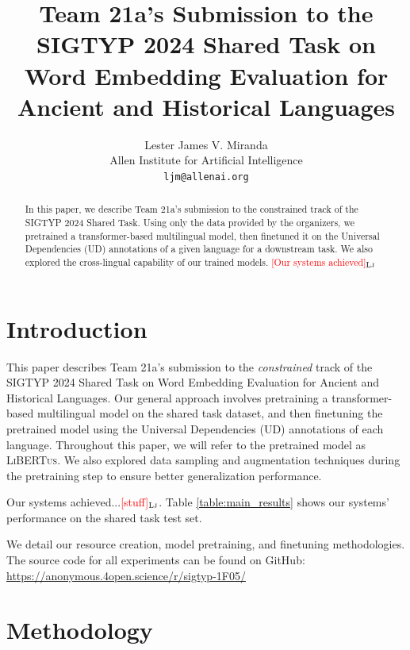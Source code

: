 \documentclass[11pt]{article}
\title{Team 21a's Submission to the SIGTYP 2024 Shared Task on Word Embedding Evaluation for Ancient and Historical Languages}
\author{Lester James V. Miranda \\
  Allen Institute for Artificial Intelligence \\
  \texttt{ljm@allenai.org} \\
}
\newcommand{\draftonly}[1]{#1}
\newcommand{\draftcomment}[3]{\draftonly{\textcolor{#2}{[#3]{$_{\textsc{#1}}$}}}}
\newcommand{\lj}[1]{\draftcomment{Lj}{red}{#1}}
\newcommand{\libertus}{\textsc{LiBERTus}}
\begin{document}
\maketitle

\begin{abstract}
In this paper, we describe Team 21a's submission to the constrained track of the SIGTYP 2024 Shared Task.
Using only the data provided by the organizers, we pretrained a transformer-based multilingual model, then finetuned it on the Universal Dependencies (UD) annotations of a given language for a downstream task.
We also explored the cross-lingual capability of our trained models.
\lj{Our systems achieved}
\end{abstract}

\section{Introduction}
This paper describes Team 21a's submission to the \textit{constrained} track of the SIGTYP 2024 Shared Task on Word Embedding Evaluation for Ancient and Historical Languages.
Our general approach involves pretraining a transformer-based multilingual model on the shared task dataset, and then finetuning the pretrained model using the Universal Dependencies (UD) annotations of each language.
Throughout this paper, we will refer to the pretrained model as \libertus{}.
We also explored data sampling and augmentation techniques during the pretraining step to ensure better generalization performance.

Our systems achieved...\lj{stuff}. 
Table \ref{table:main_results} shows our systems' performance on the shared task test set.


We detail our resource creation, model pretraining, and finetuning methodologies.
The source code for all experiments can be found on GitHub: \url{https://anonymous.4open.science/r/sigtyp-1F05/}



\section{Methodology}

\end{document}
